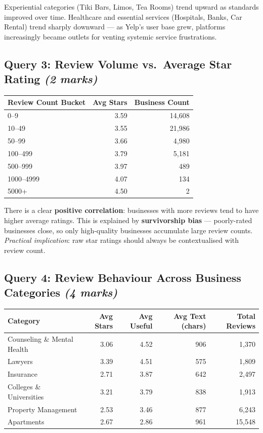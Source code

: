 \documentclass[12pt,a4paper]{article}
\newcommand{\marks}[1]{\hfill\textit{(#1 marks)}}
\begin{document}
Experiential categories (Tiki Bars, Limos, Tea Rooms) trend upward as
standards improved over time. Healthcare and essential services (Hospitals,
Banks, Car Rental) trend sharply downward --- as Yelp's user base grew,
platforms increasingly became outlets for venting systemic service frustrations.

\subsection{Query 3: Review Volume vs.\ Average Star Rating \marks{2}}

\begin{table}[H]
  \centering
  \begin{tabular}{lrr}
    \toprule
    \textbf{Review Count Bucket} & \textbf{Avg Stars} & \textbf{Business Count} \\
    \midrule
    0--9      & 3.59 & 14,608 \\
    10--49    & 3.55 & 21,986 \\
    50--99    & 3.66 &  4,980 \\
    100--499  & 3.79 &  5,181 \\
    500--999  & 3.97 &    489 \\
    1000--4999 & 4.07 &   134 \\
    5000+     & 4.50 &      2 \\
    \bottomrule
  \end{tabular}
\end{table}

There is a clear \textbf{positive correlation}: businesses with more reviews
tend to have higher average ratings. This is explained by \textbf{survivorship
bias} --- poorly-rated businesses close, so only high-quality businesses
accumulate large review counts. \textit{Practical implication}: raw star
ratings should always be contextualised with review count.

\subsection{Query 4: Review Behaviour Across Business Categories \marks{4}}

\begin{table}[H]
  \centering
  \begin{tabular}{lrrrr}
    \toprule
    \textbf{Category} & \textbf{Avg Stars} & \textbf{Avg Useful} & \textbf{Avg Text (chars)} & \textbf{Total Reviews} \\
    \midrule
    Counseling \& Mental Health & 3.06 & 4.52 & 906  & 1,370 \\
    Lawyers                     & 3.39 & 4.51 & 575  & 1,809 \\
    Insurance                   & 2.71 & 3.87 & 642  & 2,497 \\
    Colleges \& Universities    & 3.21 & 3.79 & 838  & 1,913 \\
    Property Management         & 2.53 & 3.46 & 877  & 6,243 \\
    Apartments                  & 2.67 & 2.86 & 961  & 15,548 \\
    \bottomrule
  \end{tabular}
\end{table}
\end{document}
